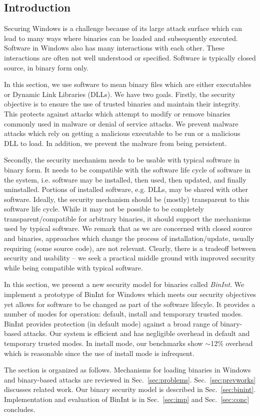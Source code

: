 \subsection{Introduction}

Securing Windows is a challenge because of its large
attack surface which can lead to many ways where
binaries can be loaded and subsequently executed.
Software in Windows also has many interactions with each other.
These interactions are often not well understood or specified.
Software is typically closed source, in binary form only.

In this section, we use software to mean binary files which are either
executables or Dynamic Link Libraries (DLLs).
We have two goals. Firstly, the security objective 
is to ensure the use of trusted binaries and maintain their integrity.
This protects against attacks which attempt to modify or remove binaries 
commonly used in malware or denial of service attacks.
We prevent malware attacks which rely on
getting a malicious executable to be run or
a malicious DLL to load.
In addition, we prevent the malware from being persistent.

Secondly, the security mechanism needs to be usable with typical
software in binary form.
It needs to be compatible with the software life cycle of software in the
system, i.e.
software may be installed, then used, then updated, and 
finally uninstalled. 
Portions of installed software, e.g. DLLs,
may be shared with other software. 
Ideally, the security mechanism should be (mostly) transparent to 
this software life cycle.
While it may not be possible to be completely transparent/compatible 
for arbitrary binaries, it should support the mechanisms used 
by typical software.
We remark that as we are concerned with
closed source and binaries,
approaches which change the process of installation/update,
usually requiring (some source code), are not relevant.
Clearly, there is a tradeoff between security and usability --
we seek a practical middle ground with improved security while
being compatible with typical software.

In this section, we present a new security model
for binaries called {\em BinInt}.
We implement a prototype of BinInt for Windows 
which meets our security objectives yet allows
for software to be changed as part of the software lifecyle.
It provides a number of modes for operation: default, install 
and temporary trusted modes.
BinInt provides protection (in default mode) against a broad range of 
binary-based attacks.
Our system is efficient and has negligible overhead in default and temporary
trusted modes. 
In install mode, our benchmarks
show $\sim$12\% overhead which is reasonable since
the use of install mode is infrequent.

The section is organized as follows.
Mechanisms for loading binaries in
Windows and binary-based attacks are reviewed in Sec.~\ref{sec:problems}.
Sec.~\ref{sec:prevworks} discusses related work.
Our binary security model is described in Sec.~\ref{sec:binint}.
Implementation and evaluation of BinInt is in
Sec.~\ref{sec:imp} and Sec.~\ref{sec:conc} concludes.

